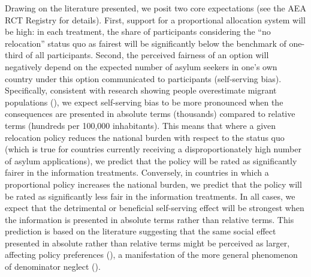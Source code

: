 \documentclass[
  12pt,
  a4paper,
]{article}
\begin{document}
Drawing on the literature presented, we posit two core expectations (see the AEA RCT Registry for details). First, support for a proportional allocation system will be high: in each treatment, the share of participants considering the ``no relocation'' status quo as fairest will be significantly below the benchmark of one-third of all participants. Second, the perceived fairness of an option will negatively depend on the expected number of asylum seekers in one's own country under this option communicated to participants (self-serving bias). Specifically, consistent with research showing people overestimate migrant populations (), we expect self-serving bias to be more pronounced when the consequences are presented in absolute terms (thousands) compared to relative terms (hundreds per 100,000 inhabitants). This means that where a given relocation policy reduces the national burden with respect to the status quo (which is true for countries currently receiving a disproportionately high number of asylum applications), we predict that the policy will be rated as significantly fairer in the information treatments. Conversely, in countries in which a proportional policy increases the national burden, we predict that the policy will be rated as significantly less fair in the information treatments. In all cases, we expect that the detrimental or beneficial self-serving effect will be strongest when the information is presented in absolute terms rather than relative terms. This prediction is based on the literature suggesting that the same social effect presented in absolute rather than relative terms might be perceived as larger, affecting policy preferences (), a manifestation of the more general phenomenon of denominator neglect ().
\end{document}
